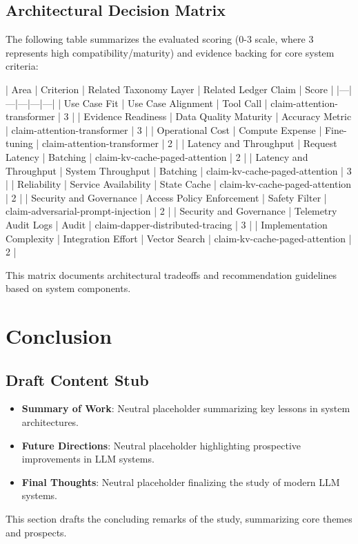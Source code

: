 \documentclass[11pt]{article}
\begin{document}
\subsection{Architectural Decision Matrix}

The following table summarizes the evaluated scoring (0-3 scale, where 3 represents high compatibility/maturity) and evidence backing for core system criteria:

| Area | Criterion | Related Taxonomy Layer | Related Ledger Claim | Score |
|---|---|---|---|---|
| Use Case Fit | Use Case Alignment | Tool Call | claim-attention-transformer | 3 |
| Evidence Readiness | Data Quality Maturity | Accuracy Metric | claim-attention-transformer | 3 |
| Operational Cost | Compute Expense | Fine-tuning | claim-attention-transformer | 2 |
| Latency and Throughput | Request Latency | Batching | claim-kv-cache-paged-attention | 2 |
| Latency and Throughput | System Throughput | Batching | claim-kv-cache-paged-attention | 3 |
| Reliability | Service Availability | State Cache | claim-kv-cache-paged-attention | 2 |
| Security and Governance | Access Policy Enforcement | Safety Filter | claim-adversarial-prompt-injection | 2 |
| Security and Governance | Telemetry Audit Logs | Audit | claim-dapper-distributed-tracing | 3 |
| Implementation Complexity | Integration Effort | Vector Search | claim-kv-cache-paged-attention | 2 |

This matrix documents architectural tradeoffs and recommendation guidelines based on system components.

\section{Conclusion}

\subsection{Draft Content Stub}

\begin{itemize}
  \item \textbf{Summary of Work}: Neutral placeholder summarizing key lessons in system architectures.
  \item \textbf{Future Directions}: Neutral placeholder highlighting prospective improvements in LLM systems.
  \item \textbf{Final Thoughts}: Neutral placeholder finalizing the study of modern LLM systems.
\end{itemize}

This section drafts the concluding remarks of the study, summarizing core themes and prospects.



\end{document}
